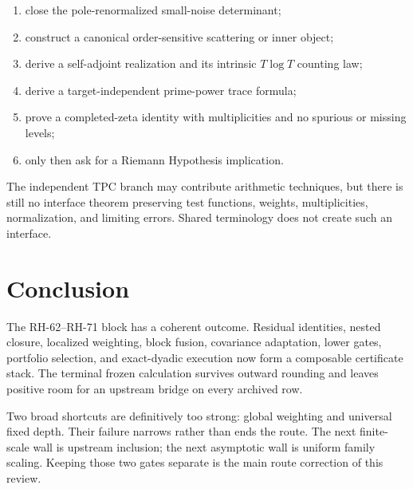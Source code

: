 \documentclass[11pt]{article}
\theoremstyle{definition}
\begin{document}
\begin{enumerate}[leftmargin=2.2em]
 \item close the pole-renormalized small-noise determinant;
 \item construct a canonical order-sensitive scattering or inner object;
 \item derive a self-adjoint realization and its intrinsic $T\log T$
       counting law;
 \item derive a target-independent prime-power trace formula;
 \item prove a completed-zeta identity with multiplicities and no spurious or
       missing levels;
 \item only then ask for a Riemann Hypothesis implication.
\end{enumerate}

The independent TPC branch may contribute arithmetic techniques, but there
is still no interface theorem preserving test functions, weights,
multiplicities, normalization, and limiting errors.  Shared terminology does
not create such an interface.

\section{Conclusion}

The RH-62--RH-71 block has a coherent outcome.  Residual identities, nested
closure, localized weighting, block fusion, covariance adaptation, lower
gates, portfolio selection, and exact-dyadic execution now form a composable
certificate stack.  The terminal frozen calculation survives outward
rounding and leaves positive room for an upstream bridge on every archived
row.

Two broad shortcuts are definitively too strong: global weighting and
universal fixed depth.  Their failure narrows rather than ends the route.
The next finite-scale wall is upstream inclusion; the next asymptotic wall is
uniform family scaling.  Keeping those two gates separate is the main route
correction of this review.



\end{document}
